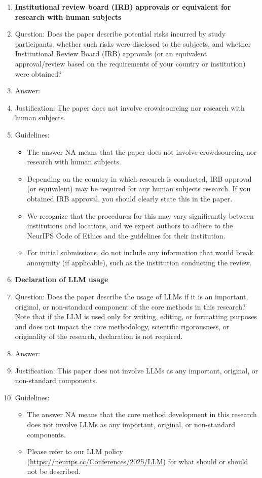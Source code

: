 \documentclass{article}
\begin{document}
\begin{enumerate}
\item {\bf Institutional review board (IRB) approvals or equivalent for research with human subjects}
    \item[] Question: Does the paper describe potential risks incurred by study participants, whether such risks were disclosed to the subjects, and whether Institutional Review Board (IRB) approvals (or an equivalent approval/review based on the requirements of your country or institution) were obtained?
    \item[] Answer: \answerNA{} %
    \item[] Justification: The paper does not involve crowdsourcing nor research with human subjects.
    \item[] Guidelines:
    \begin{itemize}
        \item The answer NA means that the paper does not involve crowdsourcing nor research with human subjects.
        \item Depending on the country in which research is conducted, IRB approval (or equivalent) may be required for any human subjects research. If you obtained IRB approval, you should clearly state this in the paper. 
        \item We recognize that the procedures for this may vary significantly between institutions and locations, and we expect authors to adhere to the NeurIPS Code of Ethics and the guidelines for their institution. 
        \item For initial submissions, do not include any information that would break anonymity (if applicable), such as the institution conducting the review.
    \end{itemize}

\item {\bf Declaration of LLM usage}
    \item[] Question: Does the paper describe the usage of LLMs if it is an important, original, or non-standard component of the core methods in this research? Note that if the LLM is used only for writing, editing, or formatting purposes and does not impact the core methodology, scientific rigorousness, or originality of the research, declaration is not required.
    \item[] Answer: \answerNA{} %
    \item[] Justification: This paper does not involve LLMs as any important, original, or non-standard components.
    \item[] Guidelines:
    \begin{itemize}
        \item The answer NA means that the core method development in this research does not involve LLMs as any important, original, or non-standard components.
        \item Please refer to our LLM policy (\url{https://neurips.cc/Conferences/2025/LLM}) for what should or should not be described.
    \end{itemize}

\end{enumerate}
\end{document}
